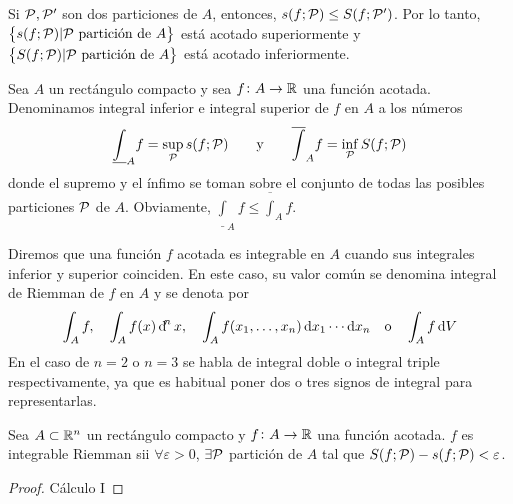 \begin{col}
    Si $\mathcal{P}, \mathcal{P}^\prime$ son dos particiones de $A$, entonces,
    $s(f;\mathcal{P}) \leq S(f;\mathcal{P}^\prime)$. Por lo tanto,
    $\left\{s(f;\mathcal{P}) \vert \mathcal{P} \text{ partición de } A\right\}$ está acotado superiormente
    y $\left\{S(f;\mathcal{P}) \vert\mathcal{P}\text{ partición de } A\right\}$ está acotado inferiormente.
\end{col}

\begin{defi}
    Sea $A$ un rectángulo compacto y sea $f \colon A \to \mathbb{R}$ una función
    acotada. Denominamos integral inferior e integral superior de $f$ en $A$ a los
    números
    \[
        \underline{\int}_A f = \sup_{\mathcal{P}} s(f;\mathcal{P}) \qquad \text{y} \qquad
        \overline{\int}_A f = \inf_{\mathcal{P}} S(f;\mathcal{P})
    \]
    donde el supremo y el ínfimo se toman sobre el conjunto de todas las posibles
    particiones $\mathcal{P}$ de $A$. Obviamente, $\underline{\int}_A f \leq
    \overline{\int}_A f$.
\end{defi}

\begin{defi}
    Diremos que una función $f$ acotada es integrable en $A$ cuando sus integrales
    inferior y superior coinciden. En este caso, su valor común se denomina
    integral de Riemman de $f$ en $A$ y se denota por
    \[
        \int_A f, \quad \int_A f(x) \dif^nx, \quad \int_A f(x_1,\dots,x_n)
        \dif x_1 \cdots \dif x_n \quad \text{o} \quad \int_A f \dif V
    \]
    En el caso de $n=2$ o $n=3$ se habla de integral doble o integral triple
    respectivamente, ya que es habitual poner dos o tres signos de integral para
    representarlas.
\end{defi}

\begin{prop}
    Sea $A \subset \mathbb{R}^n$ un rectángulo compacto y $f \colon A \to \mathbb{R}$ una
    función acotada. $f$ es integrable Riemman sii $\forall \varepsilon > 0$,
    $\exists \mathcal{P}$ partición de $A$ tal que $S(f;\mathcal{P})-s(f;\mathcal{P}) < \varepsilon$.
\end{prop}
\begin{proof}
    Cálculo I
\end{proof}


